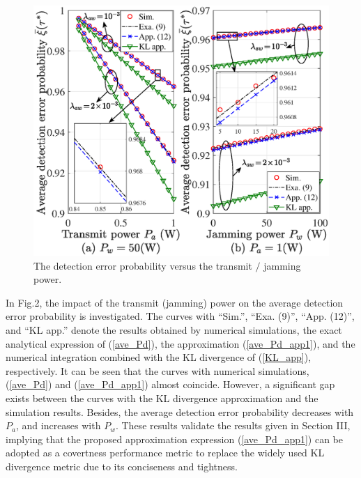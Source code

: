 \documentclass[conference]{IEEEtran}
\begin{document}
\begin{figure}
	\centering
	\includegraphics[width=0.85\linewidth]{figure/figure2.eps}
	\caption{The detection error probability versus the transmit $/$ jamming power.}
	\label{fig_sim}
\end{figure}

In Fig.2, the impact of the transmit (jamming) power on the average detection error probability is investigated. The curves with ``Sim.'', ``Exa. (9)'', ``App. (12)'', and ``KL app.'' denote the results obtained by numerical simulations, the exact analytical expression of (\ref{ave_Pd}), the approximation (\ref{ave_Pd_app1}), and the numerical integration combined with the KL divergence of (\ref{KL_app}), respectively. It can be seen that the curves with numerical simulations, (\ref{ave_Pd}) and (\ref{ave_Pd_app1}) almost coincide. However, a significant gap exists between the curves with the KL divergence approximation and the simulation results. Besides, the average detection error probability decreases with $P_a$, and increases with $P_w$. These results validate the results given in Section III, implying that the proposed approximation expression (\ref{ave_Pd_app1}) can be adopted as a covertness performance metric to replace the widely used KL divergence metric due to its conciseness and tightness.
\end{document}
